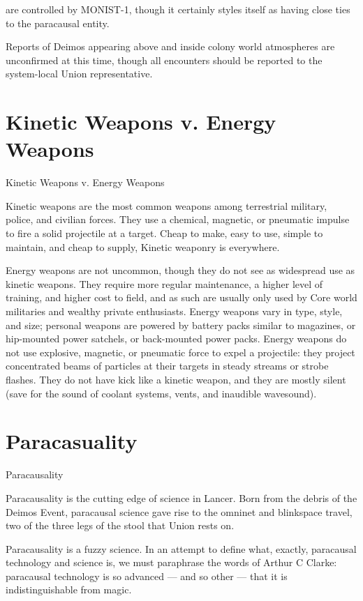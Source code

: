                                                                                                                    


are controlled by MONIST-1, though it certainly styles itself as having close ties to the paracausal  
entity. 
 

Reports of Deimos appearing above and inside colony world atmospheres are unconfirmed at  
this time, though all encounters should be reported to the system-local Union representative.
 
\section{Kinetic Weapons v. Energy Weapons}
Kinetic Weapons v. Energy Weapons  

Kinetic weapons are the most common weapons among terrestrial military, police, and civilian  
forces. They use a chemical, magnetic, or pneumatic impulse to fire a solid projectile at a target.  
Cheap to make, easy to use, simple to maintain, and cheap to supply, Kinetic weaponry is  
everywhere. 
 

Energy weapons are not uncommon, though they do not see as widespread use as kinetic  
weapons. They require more regular maintenance, a higher level of training, and higher cost to  
field, and as such are usually only used by Core world militaries and wealthy private enthusiasts.  
Energy weapons vary in type, style, and size; personal weapons are powered by battery packs  
similar to magazines, or hip-mounted power satchels, or back-mounted power packs. Energy  
weapons do not use explosive, magnetic, or pneumatic force to expel a projectile: they project  
concentrated beams of particles at their targets in steady streams or strobe flashes. They do not  
have kick like a kinetic weapon, and they are mostly silent (save for the sound of coolant  
systems, vents, and inaudible wavesound). 
 
\section{Paracasuality}
Paracausality  

Paracausality is the cutting edge of science in Lancer. Born from the debris of the Deimos Event,  
paracausal science gave rise to the omninet and blinkspace travel, two of the three legs of the  
stool that Union rests on. 
 

Paracausality is a fuzzy science. In an attempt to define what, exactly, paracausal technology  
and science is, we must paraphrase the words of Arthur C Clarke: paracausal technology is so  
advanced — and so other — that it is indistinguishable from magic.
 

